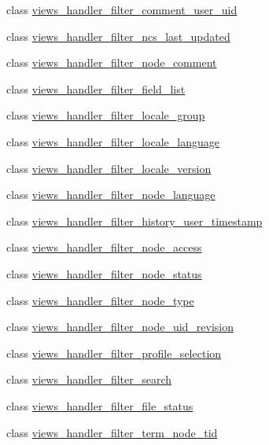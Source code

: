 \begin{DoxyCompactItemize}
class \hyperlink{classviews__handler__filter__comment__user__uid}{views\_\-handler\_\-filter\_\-comment\_\-user\_\-uid}
\item 
class \hyperlink{classviews__handler__filter__ncs__last__updated}{views\_\-handler\_\-filter\_\-ncs\_\-last\_\-updated}
\item 
class \hyperlink{classviews__handler__filter__node__comment}{views\_\-handler\_\-filter\_\-node\_\-comment}
\item 
class \hyperlink{classviews__handler__filter__field__list}{views\_\-handler\_\-filter\_\-field\_\-list}
\item 
class \hyperlink{classviews__handler__filter__locale__group}{views\_\-handler\_\-filter\_\-locale\_\-group}
\item 
class \hyperlink{classviews__handler__filter__locale__language}{views\_\-handler\_\-filter\_\-locale\_\-language}
\item 
class \hyperlink{classviews__handler__filter__locale__version}{views\_\-handler\_\-filter\_\-locale\_\-version}
\item 
class \hyperlink{classviews__handler__filter__node__language}{views\_\-handler\_\-filter\_\-node\_\-language}
\item 
class \hyperlink{classviews__handler__filter__history__user__timestamp}{views\_\-handler\_\-filter\_\-history\_\-user\_\-timestamp}
\item 
class \hyperlink{classviews__handler__filter__node__access}{views\_\-handler\_\-filter\_\-node\_\-access}
\item 
class \hyperlink{classviews__handler__filter__node__status}{views\_\-handler\_\-filter\_\-node\_\-status}
\item 
class \hyperlink{classviews__handler__filter__node__type}{views\_\-handler\_\-filter\_\-node\_\-type}
\item 
class \hyperlink{classviews__handler__filter__node__uid__revision}{views\_\-handler\_\-filter\_\-node\_\-uid\_\-revision}
\item 
class \hyperlink{classviews__handler__filter__profile__selection}{views\_\-handler\_\-filter\_\-profile\_\-selection}
\item 
class \hyperlink{classviews__handler__filter__search}{views\_\-handler\_\-filter\_\-search}
\item 
class \hyperlink{classviews__handler__filter__file__status}{views\_\-handler\_\-filter\_\-file\_\-status}
\item 
class \hyperlink{classviews__handler__filter__term__node__tid}{views\_\-handler\_\-filter\_\-term\_\-node\_\-tid}

\end{DoxyCompactItemize}
